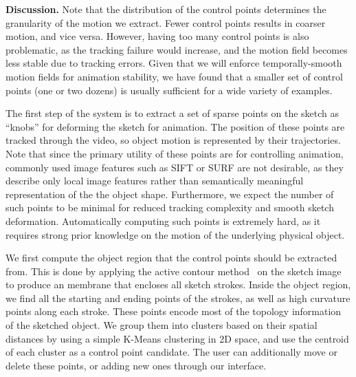 {\bf Discussion.} Note that the distribution of the control points determines the granularity of the motion we extract. Fewer control points results in coarser motion, and vice versa. However, having too many control points is also problematic, as the tracking failure would increase, and the motion field becomes less stable due to tracking errors. Given that we will enforce temporally-smooth motion fields for animation stability, we have found that a smaller set of control points (one or two dozens) is usually sufficient for a wide variety of examples. 

The first step of the system is to extract a set of sparse points on the sketch as ``knobs'' for deforming the sketch for animation. The position of these points are tracked through the video, so object motion is represented by their trajectories. Note that since the primary utility of these points are for controlling animation, commonly used image features such as SIFT or SURF are not desirable, as they describe only local image features rather than semantically meaningful representation of the the object shape. Furthermore, we expect the number of such points to be minimal for reduced tracking complexity and smooth sketch deformation. 
Automatically computing such points is extremely hard, as it requires strong prior knowledge on the motion of the underlying physical object. 

We first compute the object region that the control points should be extracted from. This is done by applying the active contour method~\cite{Kass88snakes} on the sketch image to produce an membrane that encloses all sketch strokes.
Inside the object region, we find all the starting and ending points of the strokes, as well as high curvature points along each stroke. These points encode most of the topology information of the sketched object. We group them into clusters based on their spatial distances by using a simple K-Means clustering in 2D space, and use the centroid of each cluster as a control point candidate. The user can additionally move or delete these points, or adding new ones through our interface. 



\fi